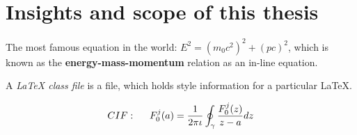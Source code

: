\section{Insights and scope of this thesis}  %
\label{section1.6}





The most famous equation in the world: $E^2 = (m_0c^2)^2 + (pc)^2$, which is 
known as the \textbf{energy-mass-momentum} relation as an in-line equation.

A {\em \LaTeX{} class file} is a file, which holds style information for a particular \LaTeX{}.

\begin{align}
CIF: \hspace*{5mm}F_0^j(a) = \frac{1}{2\pi \iota} \oint_{\gamma} \frac{F_0^j(z)}{z - a} dz
\end{align}

\nomenclature[g-p]{$\pi$}{ $\simeq 3.14\ldots$}                                             %

